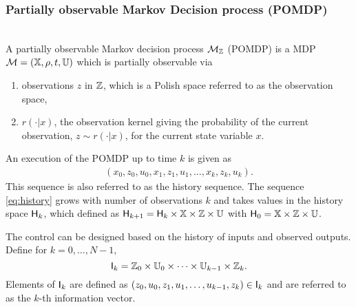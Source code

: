\documentclass{ifacconf}
\begin{document}
 

\subsubsection{Partially observable Markov Decision process (POMDP)}\label{sec:POMDP}
\begin{definition} \label{def:MDP}\mbox{ }\\
A partially observable Markov decision process $\mathcal{M}_{{\mathbb{Z}}}$ (POMDP) is a MDP $\mathcal{M} = ({\mathbb{X}}, \rho, t, {\mathbb{U}})$  which is partially observable via  
\begin{enumerate}
	\item observations $z$ in ${\mathbb{Z}}$,  which is a Polish space referred to as the observation space, %
\item $r(\cdot|x)$,  the observation kernel giving the probability of the current observation,  $z\sim r(\cdot|x)$,  for the current state variable $x$.
\end{enumerate}


\end{definition} 

An execution of the POMDP  up to time $k$ is given as
\begin{align}\label{eq:history} (x_0,z_0,u_0,x_1,z_1,u_1,\ldots,x_k,z_k,u_k).\end{align}
This sequence is also referred to as the history sequence.
The sequence  \eqref{eq:history} grows with number of observations  $k$ and takes values in the history space ${\mathsf{H}}_k$, which defined as
  ${\mathsf{H}}_{k+1}={\mathsf{H}}_{k}\times{\mathbb{X}}\times{\mathbb{Z}}\times {\mathbb{U}}$ with ${\mathsf{H}}_0={\mathbb{X}}\times{\mathbb{Z}}\times {\mathbb{U}}$.


The control can be designed based on the history of inputs and observed outputs.  
Define for $k=0,\ldots,N-1,$ 
\[{\mathsf{I}}_k={\mathbb{Z}}_0\times{\mathbb{U}}_0\times\dots\times{\mathbb{U}}_{k-1}\times{\mathbb{Z}}_k.\]
Elements of ${\mathsf{I}}_k$ are defined as $(z_0,u_0,z_1,u_1,\ldots,u_{k-1},z_k)\in{\mathsf{I}}_k$ and are referred to as the $k$-th information vector. 
 
\end{document}
